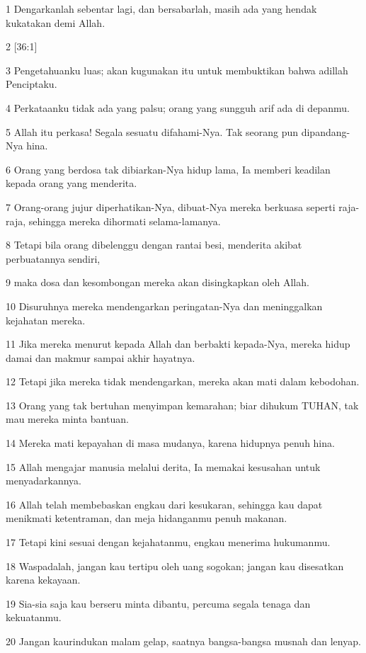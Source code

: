 \par 1 Dengarkanlah sebentar lagi, dan bersabarlah, masih ada yang hendak kukatakan demi Allah.
\par 2 [36:1]
\par 3 Pengetahuanku luas; akan kugunakan itu untuk membuktikan bahwa adillah Penciptaku.
\par 4 Perkataanku tidak ada yang palsu; orang yang sungguh arif ada di depanmu.
\par 5 Allah itu perkasa! Segala sesuatu difahami-Nya. Tak seorang pun dipandang-Nya hina.
\par 6 Orang yang berdosa tak dibiarkan-Nya hidup lama, Ia memberi keadilan kepada orang yang menderita.
\par 7 Orang-orang jujur diperhatikan-Nya, dibuat-Nya mereka berkuasa seperti raja-raja, sehingga mereka dihormati selama-lamanya.
\par 8 Tetapi bila orang dibelenggu dengan rantai besi, menderita akibat perbuatannya sendiri,
\par 9 maka dosa dan kesombongan mereka akan disingkapkan oleh Allah.
\par 10 Disuruhnya mereka mendengarkan peringatan-Nya dan meninggalkan kejahatan mereka.
\par 11 Jika mereka menurut kepada Allah dan berbakti kepada-Nya, mereka hidup damai dan makmur sampai akhir hayatnya.
\par 12 Tetapi jika mereka tidak mendengarkan, mereka akan mati dalam kebodohan.
\par 13 Orang yang tak bertuhan menyimpan kemarahan; biar dihukum TUHAN, tak mau mereka minta bantuan.
\par 14 Mereka mati kepayahan di masa mudanya, karena hidupnya penuh hina.
\par 15 Allah mengajar manusia melalui derita, Ia memakai kesusahan untuk menyadarkannya.
\par 16 Allah telah membebaskan engkau dari kesukaran, sehingga kau dapat menikmati ketentraman, dan meja hidanganmu penuh makanan.
\par 17 Tetapi kini sesuai dengan kejahatanmu, engkau menerima hukumanmu.
\par 18 Waspadalah, jangan kau tertipu oleh uang sogokan; jangan kau disesatkan karena kekayaan.
\par 19 Sia-sia saja kau berseru minta dibantu, percuma segala tenaga dan kekuatanmu.
\par 20 Jangan kaurindukan malam gelap, saatnya bangsa-bangsa musnah dan lenyap.
